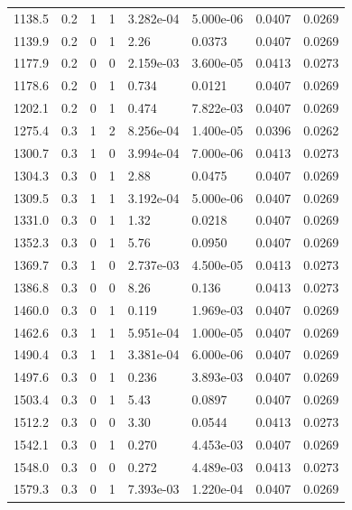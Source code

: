\documentclass[preview]{standalone}
\begin{document}
{{{\begin{tabular}{L{1.2cm}C{1.2cm} C{0.3cm}C{0.5cm} C{1.4cm}C{1.4cm} C{1.4cm}C{1.4cm}}
  1138.5  &   0.2  & 1     &  1 &  3.282e-04  & 5.000e-06  & 0.0407 &  0.0269   \\ 
  1139.9  &   0.2  & 0     &  1 &  2.26  & 0.0373  & 0.0407 &  0.0269   \\ 
  1177.9  &   0.2  & 0     &  0 &  2.159e-03  & 3.600e-05  & 0.0413 &  0.0273   \\ 
  1178.6  &   0.2  & 0     &  1 &  0.734  & 0.0121  & 0.0407 &  0.0269   \\ 
  1202.1  &   0.2  & 0     &  1 &  0.474  & 7.822e-03  & 0.0407 &  0.0269   \\ 
  1275.4  &   0.3  & 1     &  2 &  8.256e-04  & 1.400e-05  & 0.0396 &  0.0262   \\ 
  1300.7  &   0.3  & 1     &  0 &  3.994e-04  & 7.000e-06  & 0.0413 &  0.0273   \\ 
  1304.3  &   0.3  & 0     &  1 &  2.88  & 0.0475  & 0.0407 &  0.0269   \\ 
  1309.5  &   0.3  & 1     &  1 &  3.192e-04  & 5.000e-06  & 0.0407 &  0.0269   \\ 
  1331.0  &   0.3  & 0     &  1 &  1.32  & 0.0218  & 0.0407 &  0.0269   \\ 
  1352.3  &   0.3  & 0     &  1 &  5.76  & 0.0950  & 0.0407 &  0.0269   \\ 
  1369.7  &   0.3  & 1     &  0 &  2.737e-03  & 4.500e-05  & 0.0413 &  0.0273   \\ 
  1386.8  &   0.3  & 0     &  0 &  8.26  & 0.136  & 0.0413 &  0.0273   \\ 
  1460.0  &   0.3  & 0     &  1 &  0.119  & 1.969e-03  & 0.0407 &  0.0269   \\ 
  1462.6  &   0.3  & 1     &  1 &  5.951e-04  & 1.000e-05  & 0.0407 &  0.0269   \\ 
  1490.4  &   0.3  & 1     &  1 &  3.381e-04  & 6.000e-06  & 0.0407 &  0.0269   \\ 
  1497.6  &   0.3  & 0     &  1 &  0.236  & 3.893e-03  & 0.0407 &  0.0269   \\ 
  1503.4  &   0.3  & 0     &  1 &  5.43  & 0.0897  & 0.0407 &  0.0269   \\ 
  1512.2  &   0.3  & 0     &  0 &  3.30  & 0.0544  & 0.0413 &  0.0273   \\ 
  1542.1  &   0.3  & 0     &  1 &  0.270  & 4.453e-03  & 0.0407 &  0.0269   \\ 
  1548.0  &   0.3  & 0     &  0 &  0.272  & 4.489e-03  & 0.0413 &  0.0273   \\ 
  1579.3  &   0.3  & 0     &  1 &  7.393e-03  & 1.220e-04  & 0.0407 &  0.0269   \\ 

\end{tabular}}}}
\end{document}
